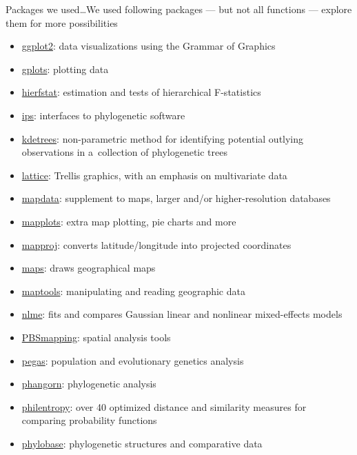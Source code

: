 \documentclass[compress, xelatex, 11pt, xcolor=svgnames, aspectratio=169,
	hyperref={
		bookmarks=true,
		unicode=true,
		colorlinks=true,
		pdftitle={Molecular data in R},
		plainpages=false,
		pdfauthor={Vojtech Zeisek},
		pdfsubject={Course about phylogeny and evolution in R},
		pdfcreator={XeLaTeX},
		pdfkeywords={R, evolution, phylogeny, molecular data},
		linkcolor=Crimson, %
		anchorcolor=Magenta, %
		citecolor=Magenta, %
		filecolor=Magenta, %
		menucolor=Magenta, %
		urlcolor=DodgerBlue, %
		},
	url={hyphens, lowtilde} %
	]{beamer}
\begin{document}
\begin{frame}[allowframebreaks]{Packages we used\ldots}{We used following packages --- but not all functions --- explore them for more possibilities}
\begin{itemize}
		\item \href{https://CRAN.R-project.org/package=ggplot2}{ggplot2}: data visualizations using the Grammar of Graphics
		\item \href{https://CRAN.R-project.org/package=gplots}{gplots}: plotting data
		\item \href{https://CRAN.R-project.org/package=hierfstat}{hierfstat}: estimation and tests of hierarchical F-statistics
		\item \href{https://CRAN.R-project.org/package=ips}{ips}: interfaces to phylogenetic software
		\item \href{https://github.com/V-Z/kdetrees}{kdetrees}: non-parametric method for identifying potential outlying observations in a~collection of phylogenetic trees
		\item \href{https://CRAN.R-project.org/package=lattice}{lattice}: Trellis graphics, with an emphasis on multivariate data
		\item \href{https://CRAN.R-project.org/package=mapdata}{mapdata}: supplement to maps, larger and/or higher-resolution databases
		\item \href{https://CRAN.R-project.org/package=mapplots}{mapplots}: extra map plotting, pie charts and more
		\item \href{https://CRAN.R-project.org/package=mapproj}{mapproj}: converts latitude/longitude into projected coordinates
		\item \href{https://CRAN.R-project.org/package=maps}{maps}: draws geographical maps
		\item \href{https://CRAN.R-project.org/package=maptools}{maptools}: manipulating and reading geographic data %
		\item \href{https://CRAN.R-project.org/package=nlme}{nlme}: fits and compares Gaussian linear and nonlinear mixed-effects models
		\item \href{https://CRAN.R-project.org/package=PBSmapping}{PBSmapping}: spatial analysis tools
		\item \href{https://CRAN.R-project.org/package=pegas}{pegas}: population and evolutionary genetics analysis
		\item \href{https://CRAN.R-project.org/package=phangorn}{phangorn}: phylogenetic analysis
		\item \href{https://CRAN.R-project.org/package=philentropy}{philentropy}: over 40 optimized distance and similarity measures for comparing probability functions
		\item \href{https://CRAN.R-project.org/package=phylobase}{phylobase}: phylogenetic structures and comparative data

\end{itemize}
\end{frame}
\end{document}
